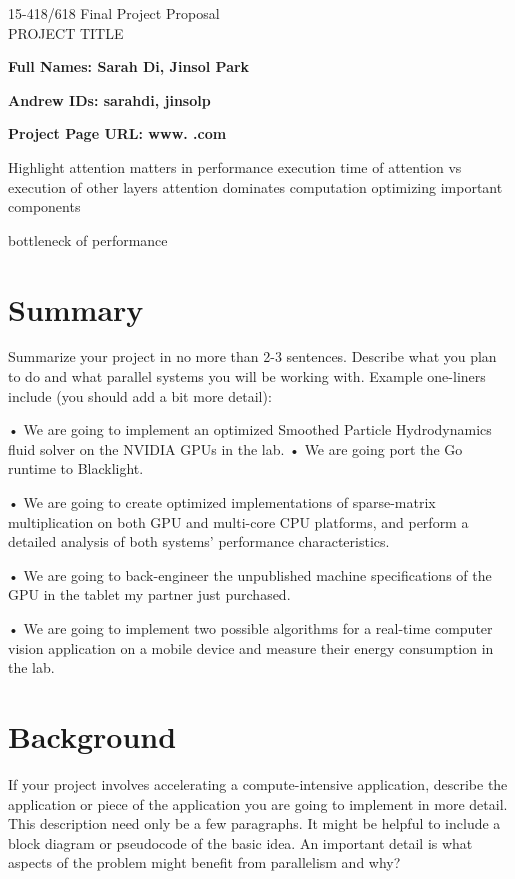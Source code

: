 \documentclass[11pt]{article}
\begin{document}
\begin{center}
\LARGE
15-418/618 \thisterm{} Final Project Proposal
\\ 
PROJECT TITLE
\end{center}
\begin{flushright}
{\large\bf Full Names: Sarah Di, Jinsol Park\makebox[2in][l]{

}}

{\large\bf Andrew IDs: sarahdi, jinsolp\makebox[2in][l]{\tt

}}
\end{flushright}

{\large\bf Project Page URL: www. .com\makebox[2in][l]{

}}

Highlight attention matters in performance
execution time of attention vs execution of other layers
attention dominates computation
optimizing important components

bottleneck of performance

\section{Summary}
Summarize your project in no more than 2-3 sentences. Describe what you plan to do and what parallel systems you will be working with. Example one-liners include (you should add a bit more detail):

• We are going to implement an optimized Smoothed Particle Hydrodynamics fluid solver on the NVIDIA GPUs in the lab.
• We are going port the Go runtime to Blacklight.

• We are going to create optimized implementations of sparse-matrix multiplication on both GPU and multi-core CPU platforms, and perform a detailed analysis of both systems’ performance characteristics.

• We are going to back-engineer the unpublished machine specifications of the GPU in the tablet my partner just purchased.

• We are going to implement two possible algorithms for a real-time computer vision application on a mobile device and measure their energy consumption in the lab.

\section{Background}
If your project involves accelerating a compute-intensive application, describe the application or piece of the application you are going to implement in more detail. This description need only be a few paragraphs. It might be helpful to include a block diagram or pseudocode of the basic idea. An important detail is what aspects of the problem might benefit from parallelism and why?
\end{document}
